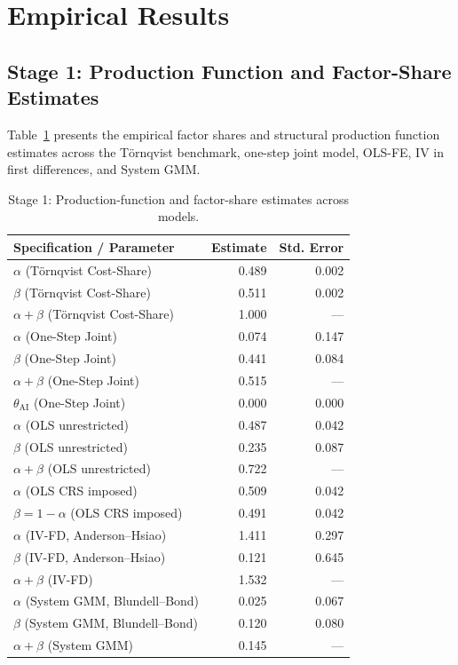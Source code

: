\documentclass[11pt,a4paper]{article}
\begin{document}
\section{Empirical Results}
\label{sec:results}

\subsection{Stage 1: Production Function and Factor-Share Estimates}
Table~\ref{tab:pf} presents the empirical factor shares and structural production function estimates across the Törnqvist benchmark, one-step joint model, OLS-FE, IV in first differences, and System GMM.

\begin{table}[!htbp]
\centering
\small
\begin{tabular}{lrr}
\toprule
\textbf{Specification / Parameter} & \textbf{Estimate} & \textbf{Std. Error} \\
\midrule
$\alpha$ (Törnqvist Cost-Share) & 0.489 & 0.002 \\
$\beta$ (Törnqvist Cost-Share) & 0.511 & 0.002 \\
$\alpha + \beta$ (Törnqvist Cost-Share) & 1.000 & --- \\
\midrule
$\alpha$ (One-Step Joint) & 0.074 & 0.147 \\
$\beta$ (One-Step Joint) & 0.441 & 0.084 \\
$\alpha + \beta$ (One-Step Joint) & 0.515 & --- \\
$\theta_{\text{AI}}$ (One-Step Joint) & 0.000 & 0.000 \\
\midrule
$\alpha$ (OLS unrestricted) & 0.487 & 0.042 \\
$\beta$ (OLS unrestricted) & 0.235 & 0.087 \\
$\alpha + \beta$ (OLS unrestricted) & 0.722 & --- \\
$\alpha$ (OLS CRS imposed) & 0.509 & 0.042 \\
$\beta = 1 - \alpha$ (OLS CRS imposed) & 0.491 & 0.042 \\
\midrule
$\alpha$ (IV-FD, Anderson--Hsiao) & 1.411 & 0.297 \\
$\beta$ (IV-FD, Anderson--Hsiao) & 0.121 & 0.645 \\
$\alpha + \beta$ (IV-FD) & 1.532 & --- \\
\midrule
$\alpha$ (System GMM, Blundell--Bond) & 0.025 & 0.067 \\
$\beta$ (System GMM, Blundell--Bond) & 0.120 & 0.080 \\
$\alpha + \beta$ (System GMM) & 0.145 & --- \\
\bottomrule
\end{tabular}
\caption{Stage 1: Production-function and factor-share estimates across models.}
\label{tab:pf}
\end{table}
\end{document}
